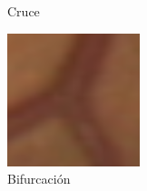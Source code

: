 \documentclass[xcolor=dvipsnames,table]{beamer}
\begin{document}
\begin{frame}
\begin{center}
{\begin{minipage}[t]{0.1\linewidth}
			\footnotesize Cruce
		\end{minipage}\hspace{0.5cm}%
		\begin{minipage}[t]{0.1\linewidth}
			\centering
			\includegraphics[width=\linewidth]{my_images/contextualizacion/image6.png}\\[0.5ex]
			\footnotesize Bifurcación
		\end{minipage}\hspace{0.5cm}%
	}%
\end{center}
\end{frame}
\end{document}
